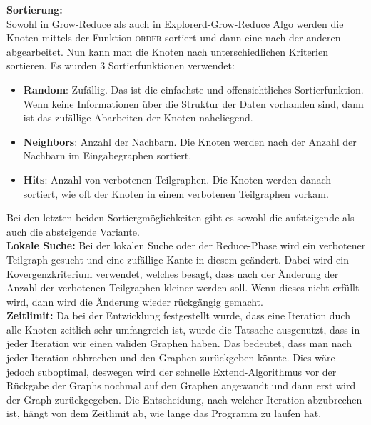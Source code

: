 \documentclass[12pt,a4paper,onecolumn,oneside,titlepage]{article}
\newcommand{\func}{\textsc}
\begin{document}
\textbf{Sortierung:}\\
Sowohl in  Grow-Reduce als auch in Explorerd-Grow-Reduce Algo werden die Knoten mittels der Funktion \func{order} sortiert und dann eine nach der anderen abgearbeitet. Nun kann man die Knoten nach unterschiedlichen Kriterien sortieren.
Es wurden 3 Sortierfunktionen verwendet:
\begin{itemize}
\item \textbf{Random}: Zufällig. Das ist die einfachste und offensichtliches Sortierfunktion. Wenn keine Informationen über die Struktur der Daten vorhanden sind, dann ist das zufällige Abarbeiten der Knoten naheliegend.
\item  \textbf{Neighbors}: Anzahl der Nachbarn. Die Knoten werden nach der Anzahl der Nachbarn im Eingabegraphen sortiert.
\item  \textbf{Hits}: Anzahl von verbotenen Teilgraphen. Die Knoten werden danach sortiert, wie oft der Knoten in einem verbotenen Teilgraphen vorkam.
\end{itemize}
Bei den letzten beiden Sortiergmöglichkeiten gibt es sowohl die aufsteigende als auch die absteigende Variante. \\

\textbf{Lokale Suche:}
Bei der lokalen Suche oder der Reduce-Phase wird ein verbotener Teilgraph gesucht und eine zufällige Kante in diesem geändert. Dabei wird ein Kovergenzkriterium verwendet, welches besagt, dass nach der Änderung der Anzahl der verbotenen Teilgraphen kleiner werden soll. Wenn dieses nicht erfüllt wird, dann wird die Änderung wieder rückgängig gemacht.\\



\textbf{Zeitlimit:}
Da bei der Entwicklung festgestellt wurde, dass eine Iteration duch alle Knoten zeitlich sehr umfangreich ist, wurde die Tatsache ausgenutzt, dass in jeder Iteration wir einen validen Graphen haben. Das bedeutet, dass man nach jeder Iteration abbrechen und den Graphen zurückgeben könnte. Dies wäre jedoch suboptimal, deswegen wird der schnelle Extend-Algorithmus vor der Rückgabe der Graphs nochmal auf den Graphen angewandt und dann erst wird der Graph zurückgegeben.
Die Entscheidung, nach welcher Iteration abzubrechen ist, hängt von dem Zeitlimit ab, wie lange das Programm zu laufen hat.
\end{document}
